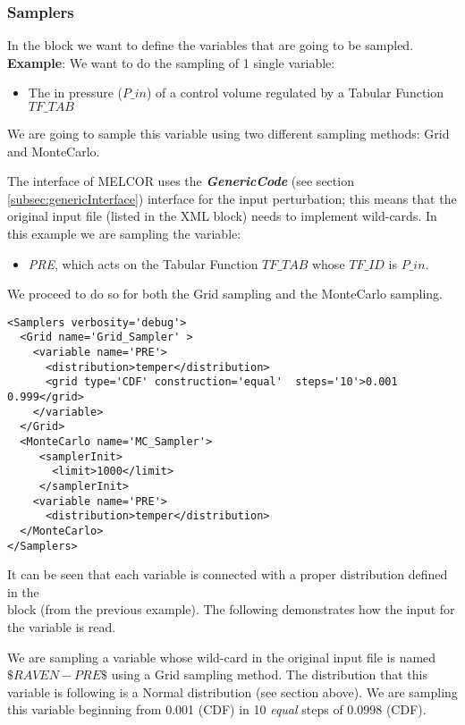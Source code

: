 \subsubsection{Samplers}
In the  block we want to define the variables that are going
to be sampled.
%
\textbf{Example}:
We want to do the sampling of 1 single variable:
\begin{itemize}
  \item The in pressure ($P\_in$) of a control volume regulated by a Tabular Function $TF\_TAB$
\end{itemize}

We are going to sample this variable using two different sampling methods:
Grid and MonteCarlo.

The interface of MELCOR uses the \textbf{\textit{GenericCode}} (see section \ref{subsec:genericInterface})
interface for the input perturbation; this means that the original input file (listed in the  XML block)
needs to implement wild-cards.
%
In this example we are sampling the variable:
\begin{itemize}
  \item \textit{PRE}, which acts on the Tabular Function $TF\_TAB$ whose $TF\_ID $ is $P\_in$.
\end{itemize}

We proceed to do so for both the Grid sampling and the MonteCarlo sampling.

\begin{lstlisting}[style=XML,morekeywords={name,type,construction,lowerBound,steps,limit,initialSeed}]
<Samplers verbosity='debug'>
  <Grid name='Grid_Sampler' >
    <variable name='PRE'>
      <distribution>temper</distribution>
      <grid type='CDF' construction='equal'  steps='10'>0.001 0.999</grid>
    </variable>
  </Grid>
  <MonteCarlo name='MC_Sampler'>
     <samplerInit>
       <limit>1000</limit>
     </samplerInit>
    <variable name='PRE'>
      <distribution>temper</distribution>
  </MonteCarlo>
</Samplers>
\end{lstlisting}

It can be seen that each variable is connected with a proper distribution
defined in the \\ block (from the previous example).
%
The following demonstrates how the input for the variable is read.

We are sampling a variable whose wild-card in the original input file is named $\$RAVEN-PRE\$$
using a Grid sampling method.
%
The distribution that this variable is following is a Normal distribution
(see section above).
%
We are sampling this variable beginning from 0.001 (CDF) in 10 \textit{equal} steps of
0.0998 (CDF).
%

